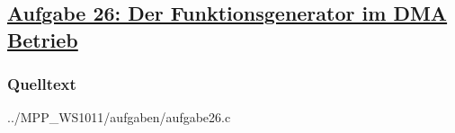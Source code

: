 \subsection*
{\href{http://cst.mi.fu-berlin.de/intern/19606-P-MPP/Aufgaben/041001.html}
{Aufgabe 26: Der Funktionsgenerator im DMA Betrieb}}

\subsubsection*{Quelltext}


{../MPP_WS1011/aufgaben/aufgabe26.c}
